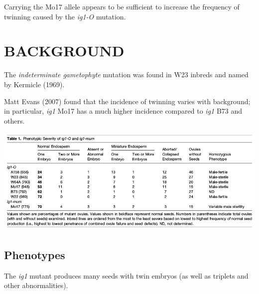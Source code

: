 \documentclass[a0,portrait]{a0poster}
\newlength{\figwidth}
\begin{document}
\begin{multicols}{3}
  Carrying the Mo17 allele appears to be sufficient to increase the frequency of twinning caused by the \textit{ig1-O} mutation.

  \section*{BACKGROUND}

  The \textit{indeterminate gametophyte} mutation was found in W23 inbreds and named by Kermicle (1969).

  Matt Evans (2007) found that the incidence of twinning varies with background; in particular, \textit{ig1} Mo17 has a much higher incidence compared to \textit{ig1} B73 and others.

  \begin{center}
    \includegraphics[width=\figwidth]{Evans-2007-Table-1.png}
  \end{center}

  \subsection*{Phenotypes}

  The \textit{ig1} mutant produces many seeds with twin embryos (as well as triplets and other abnormalities).


\end{multicols}
\end{document}
